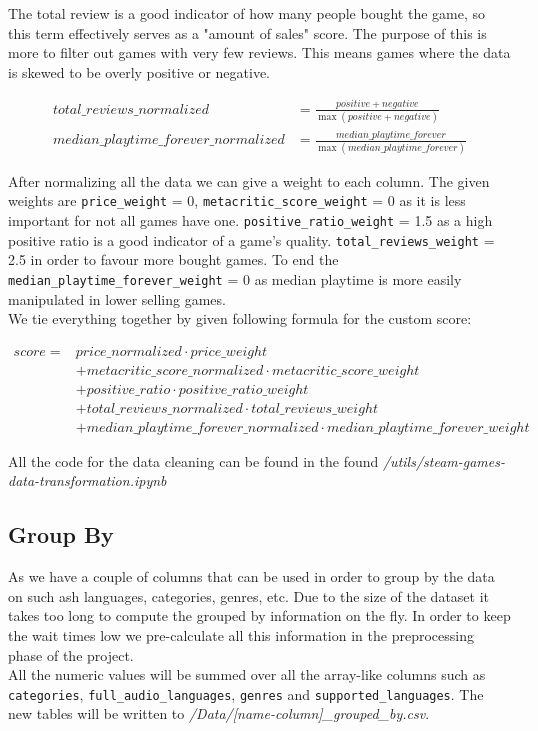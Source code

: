 \documentclass{article}
\begin{document}
	The total review is a good indicator of how many people bought the game, so this term effectively serves as a "amount of sales"  score. The purpose of this is more to filter out games with very few reviews. This means games where the data is skewed to be overly positive or negative.
	
	\begin{align}
		total\_reviews\_normalized &= \frac{positive + negative}{\max{\left(positive + negative\right)}}\\
		median\_playtime\_forever\_normalized &= \frac{median\_playtime\_forever}{\max{\left(median\_playtime\_forever\right)}}	
	\end{align}
		
	After normalizing all the data we can give a weight to each column. The given weights are \texttt{price\_weight} = 0, \texttt{metacritic\_score\_weight} = 0 as it is less important for not all games have one. \texttt{positive\_ratio\_weight} = 1.5 as a high positive ratio is a good indicator of a game's quality. \texttt{total\_reviews\_weight} = 2.5 in order to favour more bought games. To end the \texttt{median\_playtime\_forever\_weight} = 0 as median playtime is more easily manipulated in lower selling games.\\
	We tie everything together by given following formula for the custom score:
	
	\begin{align}
		score = &price\_normalized\cdot price\_weight\\
		 &+ metacritic\_score\_normalized\cdot metacritic\_score\_weight\\
		 &+ positive\_ratio\cdot positive\_ratio\_weight\\
		 &+ total\_reviews\_normalized\cdot total\_reviews\_weight\\
		 &+ median\_playtime\_forever\_normalized\cdot median\_playtime\_forever\_weight
	\end{align}
	
	All the code for the data cleaning can be found in the found \textit{/utils/steam-games-data-transformation.ipynb}
	
	\subsection{Group By}
	
	As we have a couple of columns that can be used in order to group by the data on such ash languages, categories, genres, etc. Due to the size of the dataset it takes too long to compute the grouped by information on the fly. In order to keep the wait times low we pre-calculate all this information in the preprocessing phase of the project.\\
	All the numeric values will be summed over all the array-like columns such as \texttt{categories}, \texttt{full\_audio\_languages}, \texttt{genres} and \texttt{supported\_languages}. The new tables will be written to \textit{/Data/[name-column]\_grouped\_by.csv}.
	
\end{document}
